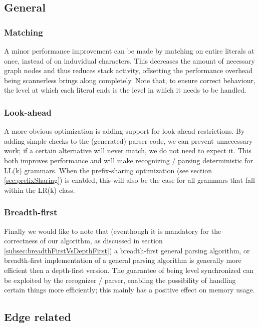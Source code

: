 \documentclass[a4paper,10pt]{article}
\begin{document}
\subsection{General}

\subsubsection{Matching}
A minor performance improvement can be made by matching on entire literals at once, instead of on induvidual characters. This decreases the amount of necessary graph nodes and thus reduces stack activity, offsetting the performance overhead being scannerless brings along completely. Note that, to ensure correct behaviour, the level at which each literal ends is the level in which it needs to be handled.

\subsubsection{Look-ahead}
A more obvious optimization is adding support for look-ahead restrictions. By adding simple checks to the (generated) parser code, we can prevent unnecessary work; if a certain alternative will never match, we do not need to expect it. This both improves performance and will make recognizing / parsing deterministic for LL(k) grammars. When the prefix-sharing optimization (see section \ref{sec:prefixSharing}) is enabled, this will also be the case for all grammars that fall within the LR(k) class.

\subsubsection{Breadth-first}
Finally we would like to note that (eventhough it is mandatory for the correctness of our algorithm, as discussed in section \ref{subsec:breadthFirstVsDepthFirst}) a breadth-first general parsing algorithm, or breadth-first implementation of a general parsing algorithm is generally more efficient then a depth-first version. The guarantee of being level synchronized can be exploited by the recognizer / parser, enabling the possibility of handling certain things more efficiently; this mainly has a positive effect on memory usage.

\subsection{Edge related}
\label{sec:edgeOptimizations}
\end{document}
